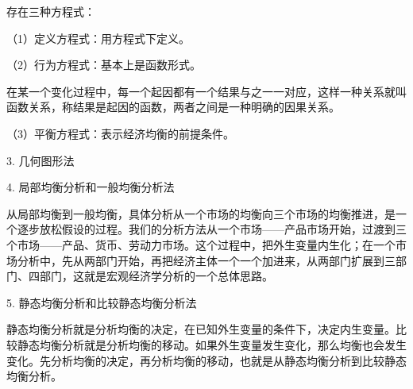 \documentclass{article}
\begin{document}
存在三种方程式：

（1）定义方程式：用方程式下定义。

（2）行为方程式：基本上是函数形式。

在某一个变化过程中，每一个起因都有一个结果与之一一对应，这样一种关系就叫函数关系，称结果是起因的函数，两者之间是一种明确的因果关系。

（3）平衡方程式：表示经济均衡的前提条件。

3. 几何图形法

4. 局部均衡分析和一般均衡分析法

从局部均衡到一般均衡，具体分析从一个市场的均衡向三个市场的均衡推进，是一个逐步放松假设的过程。我们的分析方法从一个市场——产品市场开始，过渡到三个市场——产品、货币、劳动力市场。这个过程中，把外生变量内生化；在一个市场分析中，先从两部门开始，再把经济主体一个一个加进来，从两部门扩展到三部门、四部门，这就是宏观经济学分析的一个总体思路。

5. 静态均衡分析和比较静态均衡分析法

静态均衡分析就是分析均衡的决定，在已知外生变量的条件下，决定内生变量。比较静态均衡分析就是分析均衡的移动。如果外生变量发生变化，那么均衡也会发生变化。先分析均衡的决定，再分析均衡的移动，也就是从静态均衡分析到比较静态均衡分析。
\end{document}
